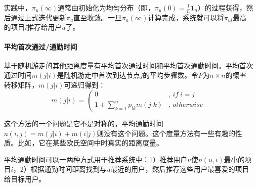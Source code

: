 \documentclass{article}
\begin{document}
 实践中，$\pi_u(\infty)$通常由初始化为均匀分布（即，$\pi_u(0)=\frac{1}{n}\mathbf{1}_n$）的过程获得，然后通过上式迭代更新$\pi_u$直至收敛。一旦$\pi_u(\infty)$计算完成，系统就可以将$\pi_{ui}$最高的项目$i$推荐给用户$u$了。

 \paragraph{平均首次通过/通勤时间}
 基于随机游走的其他距离度量有平均首次通过时间和平均首次通勤时间。平均首次通过时间$m(j|i)$是随机游走中首次到达节点$j$的平均步骤数。令$P$为$n\times n$的概率转移矩阵，$m(j|i)$可递归得到：
 \[
 m(j|i)=\left(
 \begin{array}{ll}
 0 & ,\ if\ i=j\\
 1+\mathop{\sum}\limits_{k=1}^np_{ik}m(j|k) & ,\ otherwise
 \end{array}
 \right.
 \]

 这个方法的一个问题是它不是对称的，平均通勤时间$n(i,j)=m(j|i)+m(i|j)$则没有这个问题。这个度量方法有一些有趣的性质。比如，它在某些欧氏空间中时真实的距离度量。

 平均通勤时间可以一两种方式用于推荐系统中：1）推荐用户$u$使$n(u,i)$最小的项目$i$，2）根据通勤时间距离找到与$u$最近的用户，然后推荐这些用户最喜爱的项目给目标用户。
 
\end{document}
